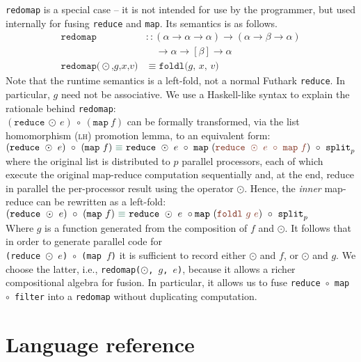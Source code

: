 \documentclass[oneside]{memoir}
\newcommand{\emp}[1]{\textcolor{DikuRed}{ #1}}
\newcommand{\emphh}[1]{\textcolor{CosGreen}{ #1}}
\begin{document}
\texttt{redomap} is a special case -- it is not intended for use by
the programmer, but used internally for fusing \texttt{reduce} and
\texttt{map}.  Its semantics is as follows.
\begin{align*}
\texttt{redomap}
& :: (\alpha\rightarrow\alpha\rightarrow\alpha)\rightarrow(\alpha\rightarrow\beta\rightarrow\alpha)\\
& \quad\rightarrow\alpha\rightarrow[\beta]\rightarrow\alpha \\
\texttt{redomap($\odot$,$g$,$x$,$v$)} & \equiv \texttt{foldl($g$, $x$, $v$)}
\end{align*}
Note that the runtime semantics is a left-fold, not a normal Futhark
\texttt{reduce}.  In particular, $g$ need not be associative.  We use
a Haskell-like syntax to explain the
rationale behind \texttt{redomap}:\\
$(\texttt{reduce}\ \odot\ e)\ \circ\ (\texttt{map}\ f)$ can be
formally transformed, via the list homomorphism (\textsc{lh})
promotion lemma, to an
equivalent form:  \\
$(\texttt{reduce}\ \odot\ e)\ \circ\ (\texttt{map}\ f)\
\emphh{\equiv}\ \texttt{reduce}\ \odot\
e\ \circ\ \texttt{map}\ (\emp{\texttt{reduce}\ \odot\ e\ \circ\ \texttt{map}\ f})\ \circ\ \texttt{split}_{p}$\\
where the original list is distributed to $p$ parallel processors,
each of which execute the original map-reduce computation sequentially
and, at the end, reduce in parallel the per-processor result using the
operator $\odot$.  Hence, the \textit{inner} map-reduce can be
rewritten as a left-fold:\\
$(\texttt{reduce}\ \odot\ e)\ \circ\ (\texttt{map}\ f)\
\emphh{\equiv}\ \texttt{reduce}\ \odot\
e\ \circ \texttt{map} \ (\emp{\texttt{foldl}\ g\ e})\ \circ\ \texttt{split}_{p}$\\
Where $g$ is a function generated from the composition of $f$ and
$\odot$.  It follows that in order to generate parallel code for \\
\texttt{(reduce $\odot$ $e$) $\circ$ (map $f$)} it is sufficient to
record either $\odot$ and $f$, or $\odot$ and $g$. We choose the
latter, i.e., \texttt{redomap($\odot$, $g$, $e$)}, because it allows a
richer compositional algebra for fusion.  In particular, it allows us
to fuse \texttt{reduce~$\circ$~map~$\circ$~filter} into a
\texttt{redomap} without duplicating computation.

\section{Language reference}
\label{sec:futhark-reference}
\end{document}
